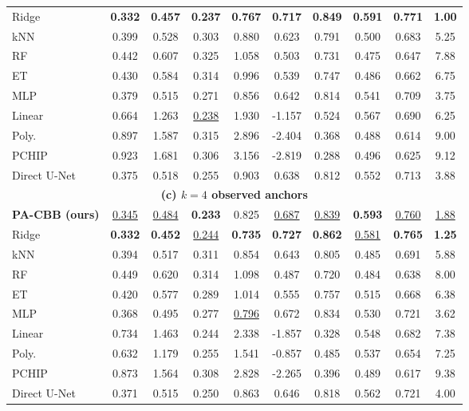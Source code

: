 \begin{table}[!t]
{\begin{tabular}{l*{9}{c}}
Ridge & \textbf{0.332} & \textbf{0.457} & \textbf{0.237} & \textbf{0.767} & \textbf{0.717} & \textbf{0.849} & \textbf{0.591} & \textbf{0.771} & \textbf{1.00} \\
kNN & 0.399 & 0.528 & 0.303 & 0.880 & 0.623 & 0.791 & 0.500 & 0.683 & 5.25 \\
RF & 0.442 & 0.607 & 0.325 & 1.058 & 0.503 & 0.731 & 0.475 & 0.647 & 7.88 \\
ET & 0.430 & 0.584 & 0.314 & 0.996 & 0.539 & 0.747 & 0.486 & 0.662 & 6.75 \\
MLP & 0.379 & 0.515 & 0.271 & 0.856 & 0.642 & 0.814 & 0.541 & 0.709 & 3.75 \\
Linear & 0.664 & 1.263 & \underline{0.238} & 1.930 & -1.157 & 0.524 & 0.567 & 0.690 & 6.25 \\
Poly. & 0.897 & 1.587 & 0.315 & 2.896 & -2.404 & 0.368 & 0.488 & 0.614 & 9.00 \\
PCHIP & 0.923 & 1.681 & 0.306 & 3.156 & -2.819 & 0.288 & 0.496 & 0.625 & 9.12 \\
Direct U-Net & 0.375 & 0.518 & 0.255 & 0.903 & 0.638 & 0.812 & 0.552 & 0.713 & 3.88 \\
\midrule
\multicolumn{10}{c}{\textbf{(c) $k=4$ observed anchors}} \\
\midrule
\textbf{PA-CBB (ours)} & \underline{0.345} & \underline{0.484} & \textbf{0.233} & 0.825 & \underline{0.687} & \underline{0.839} & \textbf{0.593} & \underline{0.760} & \underline{1.88} \\
Ridge & \textbf{0.332} & \textbf{0.452} & \underline{0.244} & \textbf{0.735} & \textbf{0.727} & \textbf{0.862} & \underline{0.581} & \textbf{0.765} & \textbf{1.25} \\
kNN & 0.394 & 0.517 & 0.311 & 0.854 & 0.643 & 0.805 & 0.485 & 0.691 & 5.88 \\
RF & 0.449 & 0.620 & 0.314 & 1.098 & 0.487 & 0.720 & 0.484 & 0.638 & 8.00 \\
ET & 0.420 & 0.577 & 0.289 & 1.014 & 0.555 & 0.757 & 0.515 & 0.668 & 6.38 \\
MLP & 0.368 & 0.495 & 0.277 & \underline{0.796} & 0.672 & 0.834 & 0.530 & 0.721 & 3.62 \\
Linear & 0.734 & 1.463 & 0.244 & 2.338 & -1.857 & 0.328 & 0.548 & 0.682 & 7.38 \\
Poly. & 0.632 & 1.179 & 0.255 & 1.541 & -0.857 & 0.485 & 0.537 & 0.654 & 7.25 \\
PCHIP & 0.873 & 1.564 & 0.308 & 2.828 & -2.265 & 0.396 & 0.489 & 0.617 & 9.38 \\
Direct U-Net & 0.371 & 0.515 & 0.250 & 0.863 & 0.646 & 0.818 & 0.562 & 0.721 & 4.00 \\
\bottomrule
\end{tabular}%
}
\end{table}

